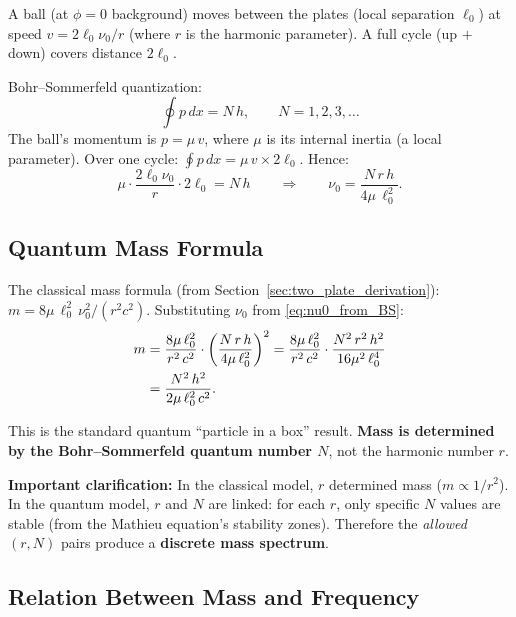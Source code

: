 \documentclass[11pt]{article}
\begin{document}
A ball (at $\phi = 0$ background) moves between the plates
(local separation $\ell_0$) at speed
$v = 2\ell_0\nu_0/r$ (where $r$ is the harmonic parameter). A
full cycle (up $+$ down) covers distance $2\ell_0$.

Bohr--Sommerfeld quantization:
\begin{equation}
  \oint p\,dx = N\,h, \qquad N = 1, 2, 3, \ldots
  \label{eq:bohr_sommerfeld}
\end{equation}
The ball's momentum is $p = \mu\,v$, where $\mu$ is its internal
inertia (a local parameter). Over one cycle:
$\oint p\,dx = \mu\,v \times 2\ell_0$. Hence:
\begin{equation}
  \mu \cdot \frac{2\ell_0\nu_0}{r}\cdot 2\ell_0
  = N\,h
  \qquad\Longrightarrow\qquad
  \nu_0 = \frac{N\,r\,h}{4\mu\,\ell_0^2}.
  \label{eq:nu0_from_BS}
\end{equation}

\subsection{Quantum Mass Formula}

The classical mass formula
(from Section~\ref{sec:two_plate_derivation}):
$m = 8\mu\,\ell_0^2\,\nu_0^2 / (r^2 c^2)$.
Substituting $\nu_0$ from \eqref{eq:nu0_from_BS}:
\begin{align}
  m &= \frac{8\mu\,\ell_0^2}{r^2\,c^2}
  \cdot\left(\frac{N\,r\,h}{4\mu\,\ell_0^2}\right)^2
  = \frac{8\mu\,\ell_0^2}{r^2\,c^2}
  \cdot\frac{N^2\,r^2\,h^2}{16\mu^2\,\ell_0^4}
  \notag\\
  &= \frac{N^2\,h^2}{2\mu\,\ell_0^2\,c^2}.
  \label{eq:mass_quantum_box}
\end{align}

This is the standard quantum ``particle in a box'' result.
\textbf{Mass is determined by the Bohr--Sommerfeld quantum number
$N$}, not the harmonic number $r$.

\medskip
\textbf{Important clarification:} In the classical model, $r$
determined mass ($m \propto 1/r^2$). In the quantum model, $r$
and $N$ are linked: for each $r$, only specific $N$ values are
stable (from the Mathieu equation's stability zones). Therefore the
\emph{allowed} $(r, N)$ pairs produce a \textbf{discrete mass
spectrum}.

\subsection{Relation Between Mass and Frequency}
\end{document}
